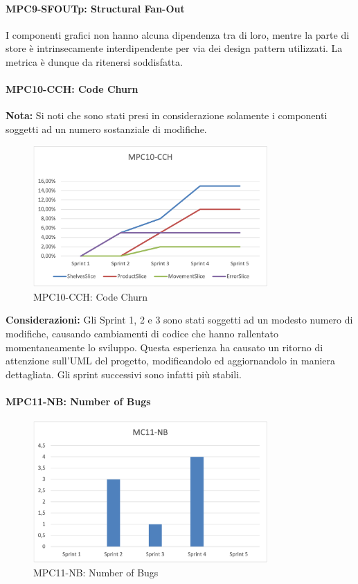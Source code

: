 \paragraph{MPC9-SFOUTp: Structural Fan-Out}
I componenti grafici non hanno alcuna dipendenza tra di loro, mentre la parte di store è intrinsecamente interdipendente per via dei design pattern utilizzati. La metrica è dunque da ritenersi soddisfatta.

\newpage
\paragraph{MPC10-CCH: Code Churn}

\textbf{Nota:} Si noti che sono stati presi in considerazione solamente i componenti soggetti ad un numero sostanziale di modifiche.

\begin{figure}[h!] 
    \centering
    \includegraphics[width=0.8\textwidth]{images/MPC10-CCH.png}
    \caption{MPC10-CCH: Code Churn}
\end{figure}

\noindent \textbf{Considerazioni:} Gli Sprint 1, 2 e 3 sono stati soggetti ad un modesto numero di modifiche, causando cambiamenti di codice che hanno rallentato momentaneamente lo sviluppo. Questa esperienza ha causato un ritorno di attenzione sull'UML del progetto, modificandolo ed aggiornandolo in maniera dettagliata. Gli sprint successivi sono infatti più stabili.


\paragraph{MPC11-NB: Number of Bugs}
\begin{figure}[h!] 
    \centering
    \includegraphics[width=0.8\textwidth]{images/MPC11-NB.png}
    \caption{MPC11-NB: Number of Bugs}
\end{figure}

